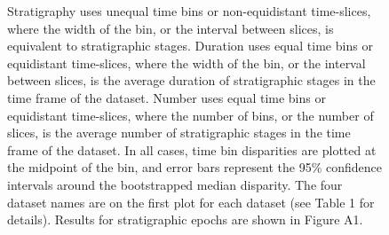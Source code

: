 \documentclass[12pt,a4paper]{article}
\begin{document}
\begin{figure}[!htbp]
{    Stratigraphy uses unequal time bins or non-equidistant time-slices, where the width of the bin, or the interval between slices, is equivalent to stratigraphic stages. 
    Duration uses equal time bins or equidistant time-slices, where the width of the bin, or the interval between slices, is the average duration of stratigraphic stages in the time frame of the dataset. 
    Number uses equal time bins or equidistant time-slices, where the number of bins, or the number of slices, is the average number of stratigraphic stages in the time frame of the dataset. 
    In all cases, time bin disparities are plotted at the midpoint of the bin, and error bars represent the 95\% confidence intervals around the bootstrapped median disparity.
    The four dataset names are on the first plot for each dataset (see Table 1 for details).
    Results for stratigraphic epochs are shown in Figure A1.}
    \label{figure:dtt3}
  \end{figure}   
\end{document}
